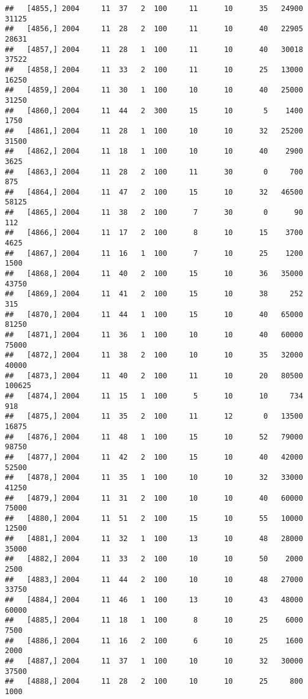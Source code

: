 \documentclass{article}\usepackage[]{graphicx}\usepackage[]{color}
\makeatletter
\newenvironment{kframe}{%
 \def\at@end@of@kframe{}%
 \ifinner\ifhmode%
  \def\at@end@of@kframe{\end{minipage}}%
  \begin{minipage}{\columnwidth}%
 \fi\fi%
 \def\FrameCommand##1{\hskip\@totalleftmargin \hskip-\fboxsep
 \colorbox{shadecolor}{##1}\hskip-\fboxsep
     \hskip-\linewidth \hskip-\@totalleftmargin \hskip\columnwidth}%
 \MakeFramed {\advance\hsize-\width
   \@totalleftmargin\z@ \linewidth\hsize
   \@setminipage}}%
 {\par\unskip\endMakeFramed%
 \at@end@of@kframe}
\newenvironment{knitrout}{}{} %
\makeatother
\begin{document}
\begin{knitrout}
\begin{kframe}
\begin{verbatim}
##   [4855,] 2004     11  37   2  100     11      10      35   24900   31125
##   [4856,] 2004     11  28   2  100     11      10      40   22905   28631
##   [4857,] 2004     11  28   1  100     11      10      40   30018   37522
##   [4858,] 2004     11  33   2  100     11      10      25   13000   16250
##   [4859,] 2004     11  30   1  100     10      10      40   25000   31250
##   [4860,] 2004     11  44   2  300     15      10       5    1400    1750
##   [4861,] 2004     11  28   1  100     10      10      32   25200   31500
##   [4862,] 2004     11  18   1  100     10      10      40    2900    3625
##   [4863,] 2004     11  28   2  100     11      30       0     700     875
##   [4864,] 2004     11  47   2  100     15      10      32   46500   58125
##   [4865,] 2004     11  38   2  100      7      30       0      90     112
##   [4866,] 2004     11  17   2  100      8      10      15    3700    4625
##   [4867,] 2004     11  16   1  100      7      10      25    1200    1500
##   [4868,] 2004     11  40   2  100     15      10      36   35000   43750
##   [4869,] 2004     11  41   2  100     15      10      38     252     315
##   [4870,] 2004     11  44   1  100     15      10      40   65000   81250
##   [4871,] 2004     11  36   1  100     10      10      40   60000   75000
##   [4872,] 2004     11  38   2  100     10      10      35   32000   40000
##   [4873,] 2004     11  40   2  100     11      10      20   80500  100625
##   [4874,] 2004     11  15   1  100      5      10      10     734     918
##   [4875,] 2004     11  35   2  100     11      12       0   13500   16875
##   [4876,] 2004     11  48   1  100     15      10      52   79000   98750
##   [4877,] 2004     11  42   2  100     15      10      40   42000   52500
##   [4878,] 2004     11  35   1  100     10      10      32   33000   41250
##   [4879,] 2004     11  31   2  100     10      10      40   60000   75000
##   [4880,] 2004     11  51   2  100     15      10      55   10000   12500
##   [4881,] 2004     11  32   1  100     13      10      48   28000   35000
##   [4882,] 2004     11  33   2  100     10      10      50    2000    2500
##   [4883,] 2004     11  44   2  100     10      10      48   27000   33750
##   [4884,] 2004     11  46   1  100     13      10      43   48000   60000
##   [4885,] 2004     11  18   1  100      8      10      25    6000    7500
##   [4886,] 2004     11  16   2  100      6      10      25    1600    2000
##   [4887,] 2004     11  37   1  100     10      10      32   30000   37500
##   [4888,] 2004     11  28   2  100     10      10      25     800    1000

\end{verbatim}
\end{kframe}
\end{knitrout}
\end{document}
